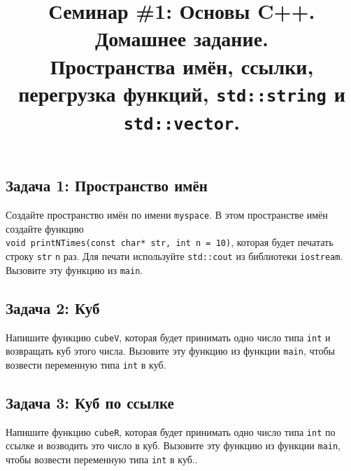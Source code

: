 \documentclass{article}
\begin{document}


\title{Семинар \#1: Основы C++. Домашнее задание. \\[1ex] \large Пространства имён, ссылки, перегрузка функций, \texttt{std::string} и \texttt{std::vector}. \vspace{-5ex}}\date{}\maketitle
\subsection*{Задача 1: Пространство имён}
Создайте пространство имён по имени \texttt{myspace}. В этом пространстве имён создайте функцию \\
 \texttt{void printNTimes(const char* str, int n = 10)}, которая будет печатать строку \texttt{str} \texttt{n} раз. Для печати используйте \texttt{std::cout} из библиотеки \texttt{iostream}. Вызовите эту функцию из \texttt{main}.



\subsection*{Задача 2: Куб}
Напишите функцию \texttt{cubeV}, которая будет принимать одно число типа \texttt{int} и возвращать куб этого числа. Вызовите эту функцию из функции \texttt{main}, чтобы возвести переменную типа \texttt{int} в куб.

\subsection*{Задача 3: Куб по ссылке}
Напишите функцию \texttt{cubeR}, которая будет принимать одно число типа \texttt{int} по ссылке и возводить это число в куб. Вызовите эту функцию из функции \texttt{main}, чтобы возвести переменную типа \texttt{int} в куб..
\end{document}
